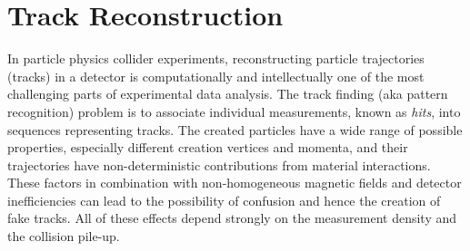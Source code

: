 
\doublespacing

\chapter{Track Reconstruction}




In particle physics collider experiments, reconstructing particle trajectories (tracks) in a detector is computationally and intellectually one of the most challenging parts of experimental data analysis. The track finding (aka pattern recognition) problem is to associate individual measurements, known as \textit{hits}, into sequences representing tracks. The created particles have a wide range of possible properties, especially different creation vertices and momenta, and their trajectories have non-deterministic contributions from material interactions. These factors in combination with non-homogeneous magnetic fields and detector inefficiencies can lead to the possibility of confusion and hence the creation of fake tracks. All of these effects depend strongly on the measurement density and the collision pile-up.

